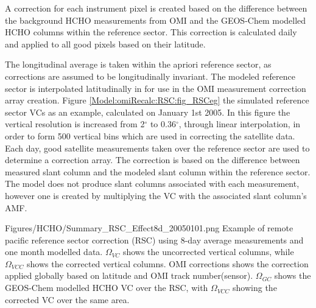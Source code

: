     A correction for each instrument pixel is created based on the difference between the background HCHO measurements from OMI and the GEOS-Chem modelled HCHO columns within the reference sector.
    This correction is calculated daily and applied to all good pixels based on their latitude.
    
    The longitudinal average is taken within the apriori reference sector, as corrections are assumed to be longitudinally invariant.
    The modeled reference sector is interpolated latitudinally in for use in the OMI measurement correction array creation.
    Figure \ref{Model:omiRecalc:RSC:fig_RSCeg} the simulated reference sector VCs as an example, calculated on January 1st 2005.
    In this figure the vertical resolution is increased from 2$^{\circ}$ to 0.36$^{\circ}$, through linear interpolation, in order to form 500 vertical bins which are used in correcting the satellite data.
    Each day, good satellite measurements taken over the reference sector are used to determine a correction array.
    The correction is based on the difference between measured slant column and the modeled slant column within the reference sector.
    The model does not produce slant columns associated with each measurement, however one is created by multiplying the VC with the associated slant column's AMF.
    
    {Figures/HCHO/Summary_RSC_Effect8d_20050101.png}
    {%
      Example of remote pacific reference sector correction (RSC) using 8-day average measurements and one month modelled data.
      $\Omega_{VC}$ shows the uncorrected vertical columns, while $\Omega_{VCC}$ shows the corrected vertical columns.
      OMI corrections shows the correction applied globally based on latitude and OMI track number(sensor).
      $\Omega_{GC}$ shows the GEOS-Chem modelled HCHO VC over the RSC, with $\Omega_{VCC}$ showing the corrected VC over the same area.
    }
    {\label{Model:omiRecalc:RSC:fig_RSCeg}}
    
